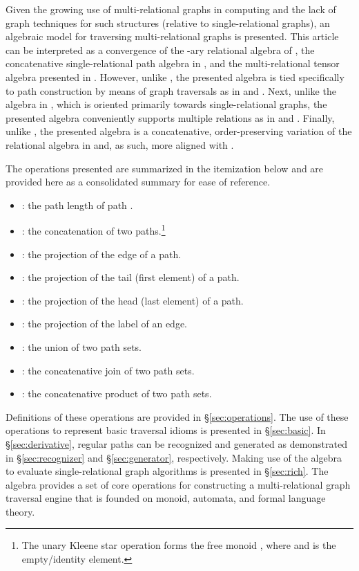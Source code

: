 \documentclass[10pt,conference,letterpaper]{IEEEtran}
\begin{document}
Given the growing use of multi-relational graphs in computing \cite{dotslines:rodriguez2010} and the lack of graph techniques for such structures (relative to single-relational graphs), an algebraic model for traversing multi-relational graphs is presented. This article can be interpreted as a convergence of the -ary relational algebra of \cite{rdbms:codd1970}, the concatenative single-relational path algebra in \cite{graphalg:russling1995}, and the multi-relational tensor algebra presented in \cite{pathalg:rodriguez2009}. However, unlike \cite{rdbms:codd1970}, the presented algebra is tied specifically to path construction by means of graph traversals as in \cite{pathalg:rodriguez2009} and \cite{graphalg:russling1995}. Next, unlike the algebra in \cite{graphalg:russling1995}, which is oriented primarily towards single-relational graphs, the presented algebra conveniently supports multiple relations as in \cite{rdbms:codd1970} and \cite{pathalg:rodriguez2009}. Finally, unlike \cite{pathalg:rodriguez2009}, the presented algebra is a concatenative, order-preserving variation of the relational algebra in \cite{rdbms:codd1970} and, as such, more aligned with \cite{graphalg:russling1995}.

The operations presented are summarized in the itemization below and are provided here as a consolidated summary for ease of reference.
\begin{itemize}
	\item : the path length of path .
	\item  : the concatenation of two paths.\footnote{The unary Kleene star operation  forms the free monoid , where  and  is the empty/identity element.}
	\item : the projection of the  edge of a path.
	\item : the projection of the tail (first element) of a path.
	\item : the projection of the head (last element) of a path.
	\item : the projection of the label of an edge.
	\item : the union of two path sets.
	\item : the concatenative join of two path sets.
	\item : the concatenative product of two path sets.
\end{itemize}

Definitions of these operations are provided in \S \ref{sec:operations}. The use of these operations to represent basic traversal idioms is presented in \S \ref{sec:basic}. In \S \ref{sec:derivative}, regular paths can be recognized and generated as demonstrated in \S \ref{sec:recognizer} and \S \ref{sec:generator}, respectively. Making use of the algebra to evaluate single-relational graph algorithms is presented in \S \ref{sec:rich}. The algebra provides a set of core operations for constructing a multi-relational graph traversal engine that is founded on monoid, automata, and formal language theory.
\end{document}

